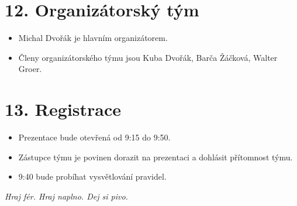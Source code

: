 \documentclass[a4paper,12pt]{article}
\begin{document}
\section*{12. Organizátorský tým}
\begin{itemize}
    \item Michal Dvořák je hlavním organizátorem.
    \item Členy organizátorského týmu jsou Kuba Dvořák, Barča Žáčková, Walter Groer. 
\end{itemize}

\section*{13. Registrace}
\begin{itemize}
    \item Prezentace bude otevřená od 9:15 do 9:50.
    \item Zástupce týmu je povinen dorazit na prezentaci a dohlásit přítomnost týmu. 
    \item 9:40 bude probíhat vysvětlování pravidel.
\end{itemize}


\vfill
\begin{center}
\textit{Hraj fér. Hraj naplno. Dej si pivo.}
\end{center}
\end{document}
